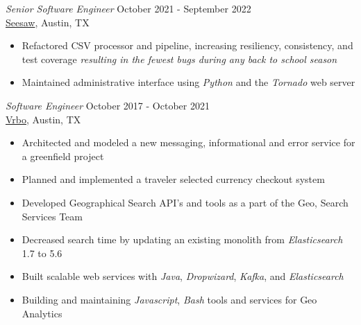 \documentclass[margin, 9pt]{res} %
\begin{document}
\begin{resume}
{\sl Senior Software Engineer} \hfill October 2021 - September 2022 \\
\href{https://web.seesaw.me/}{Seesaw}, Austin, TX
\begin{itemize}
    \item Refactored CSV processor and pipeline, increasing resiliency, consistency, and test coverage {\it resulting in the fewest bugs during any back to school season}
    \item Maintained administrative interface using {\it Python} and the {\it Tornado} web server
\end{itemize}

{\sl Software Engineer} \hfill October 2017 - October 2021 \\
\href{https://www.vrbo.com/}{Vrbo}, Austin, TX
\begin{itemize}
    \item Architected and modeled a new messaging, informational and error service for a greenfield project
    \item Planned and implemented a traveler selected currency checkout system
    \item Developed Geographical Search API's and tools as a part of the Geo, Search Services Team
    \item Decreased search time by updating an existing monolith from {\it Elasticsearch} 1.7 to 5.6
    \item Built scalable web services with {\it Java}, {\it Dropwizard}, {\it Kafka}, and {\it Elasticsearch}
    \item Building and maintaining {\it Javascript}, {\it Bash} tools and services for Geo Analytics
\end{itemize}




\end{resume}
\end{document}
